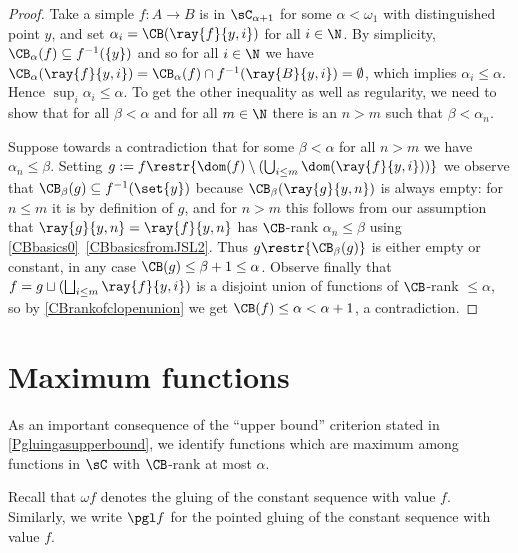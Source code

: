 \begin{proof}
Take a simple $f:A\to B$ is in $\sC_{\alpha+1}$ for some $\alpha<\omega_1$ with distinguished point $y$, and set $\alpha_i=\CB(\ray{f}{y,i})$ for all $i\in\N$.
By simplicity, $\CB_\alpha(f)\subseteq f^{-1}(\{y\})$ and so for all $i\in \N$ we have $\CB_\alpha(\ray{f}{y,i})=\CB_\alpha(f)\cap f^{-1}(\ray{B}{y,i})=\emptyset$,
which implies $\alpha_i\leq \alpha$. Hence $\sup_i\alpha_i \leq \alpha$.
To get the other inequality as well as regularity,
we need to show that for all $\beta<\alpha$ and for all $m\in\N$ there is an $n>m$ such that $\beta<\alpha_n$. 

Suppose towards a contradiction that for some $\beta<\alpha$ for all $n>m$ we have $\alpha_n\leq\beta$. Setting $g:=f\restr{\dom(f)\setminus(\bigcup_{i\leq m}\dom(\ray{f}{y,i}))}$
we observe that $\CB_\beta(g)\subseteq f^{-1}(\set{y})$ because $\CB_\beta(\ray{g}{y,n})$ is always empty: for $n\leq m$ it is by definition of $g$, and for
$n>m$ this follows from our assumption that $\ray{g}{y,n}=\ray{f}{y,n}$ has $\CB$-rank $\alpha_n\leq\beta$ using \cref{CBbasics0}~\cref{CBbasicsfromJSL2}.
Thus $g\restr{\CB_\beta(g)}$ is either empty or constant, in any case $\CB(g)\leq\beta+1\leq\alpha$.
Observe finally that $f=g\sqcup(\bigsqcup_{i\leq m}\ray{f}{y,i})$ is a disjoint union of functions of $\CB$-rank $\leq\alpha$, so by \cref{CBrankofclopenunion}
we get $\CB(f)\leq\alpha<\alpha+1$, a contradiction.
\end{proof}


\section{Maximum functions}

As an important consequence of the ``upper bound'' criterion stated in \cref{Pgluingasupperbound}, we identify functions which are maximum among functions in $\sC$ with $\CB$-rank at most $\alpha$.

Recall that $\omega f$ denotes the gluing of the constant sequence with value $f$. Similarly, we write $\pgl f$ for the pointed gluing of the constant sequence with value $f$.

